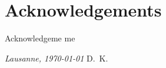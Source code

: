 \chapter*{Acknowledgements}
\lipsum[1-2]

Acknowledgeme me

\bigskip
 
\noindent\textit{Lausanne, \today}
\hfill D.~K.
